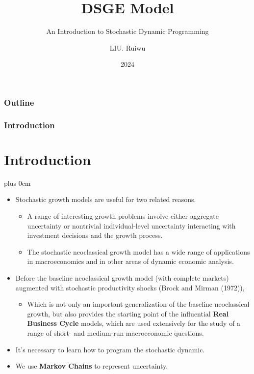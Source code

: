 \documentclass[10pt]{beamer}
\author{LIU. Ruiwu}
\institute{the Department of Economic Engineering\\Kyushu University}
\date{2024}
\title{DSGE Model \uppercase\expandafter{\romannumeral1}}
\subtitle{An Introduction to Stochastic Dynamic
Programming}
\renewcommand{\raggedright}{\leftskip=0pt \rightskip=0pt plus 0cm}
\begin{document}
	\frame{\titlepage}
	\begin{frame}[c]\frametitle{Outline}
	\tableofcontents
	\end{frame}
	\begin{frame}[c]\frametitle{Introduction}
		\section{Introduction}
\raggedright
	\begin{itemize}
\item Stochastic growth models are useful for two related reasons.
\begin{itemize}
    \item A range of interesting growth problems involve either aggregate
uncertainty or nontrivial individual-level uncertainty interacting with investment decisions and
the growth process.
\item The stochastic
neoclassical growth model has a wide range of applications in macroeconomics and in other
areas of dynamic economic analysis.
\end{itemize}
		\item Before the baseline neoclassical growth model
(with complete markets) augmented with stochastic productivity shocks (Brock and Mirman (1972)),
\begin{itemize}
    \item Which is not only an important generalization of the baseline
neoclassical growth, but also provides the starting point of the influential \textbf{Real
Business Cycle} models, which are used extensively for the study of a range of short- and
medium-run macroeconomic questions.
\end{itemize}
\item It's necessary to learn how to program the stochastic dynamic.
\item We use \textbf{Markov Chains} to represent uncertainty.
	\end{itemize}
	\end{frame}
\end{document}
